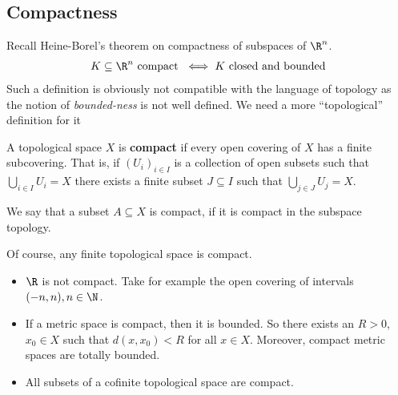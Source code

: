 \subsection{Compactness}
Recall Heine-Borel's theorem on compactness of subspaces of $\R^{n}$.
\begin{align*}
  K \subseteq \R^{n} \text{ compact } \iff K \text{ closed and bounded}
\end{align*}
Such a definition is obviously not compatible with the language of topology as the notion of \emph{bounded-ness} is not well defined.
We need a more ``topological'' definition for it

\begin{dfn}[]
  A topological space $X$ is \textbf{compact} if every open covering of $X$ has a finite subcovering. 
  That is, if $\left(U_{i}\right)_{i \in I}$ is a collection of open subsets such that $\bigcup_{i \in I}U_i = X$ there exists a finite subset $J \subseteq I$ such that $\bigcup_{j \in J}U_j = X$.

  We say that a subset $A \subseteq X$ is compact, if it is compact in the subspace topology.
\end{dfn}
\begin{ex}[]
  Of course, any finite topological space is compact. 
  \begin{itemize}
    \item $\R$ is not compact. Take for example the open covering of intervals $(-n,n), n \in \N$.
    \item If a metric space is compact, then it is bounded. So there exists an $R>0$, $x_0 \in X$ such that $d(x,x_0) < R$ for all $x \in X$.
      Moreover, compact metric spaces are totally bounded.
    \item All subsets of a cofinite topological space are compact.
  \end{itemize}
\end{ex}

